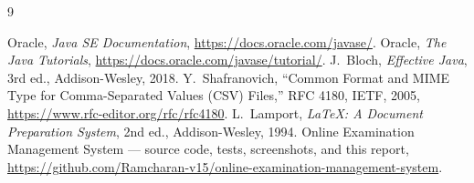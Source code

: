 \documentclass[11pt,a4paper]{article}
\begin{document}
\begin{thebibliography}{9}
 Oracle, \textit{Java SE Documentation}, \url{https://docs.oracle.com/javase/}.
 Oracle, \textit{The Java Tutorials}, \url{https://docs.oracle.com/javase/tutorial/}.
 J.~Bloch, \textit{Effective Java}, 3rd ed., Addison-Wesley, 2018.
 Y.~Shafranovich, ``Common Format and MIME Type for Comma-Separated Values (CSV) Files,'' RFC 4180, IETF, 2005, \url{https://www.rfc-editor.org/rfc/rfc4180}.
 L.~Lamport, \textit{\LaTeX: A Document Preparation System}, 2nd ed., Addison-Wesley, 1994.
 Online Examination Management System --- source code, tests, screenshots, and this report, \url{https://github.com/Ramcharan-v15/online-examination-management-system}.
\end{thebibliography}
\end{document}
